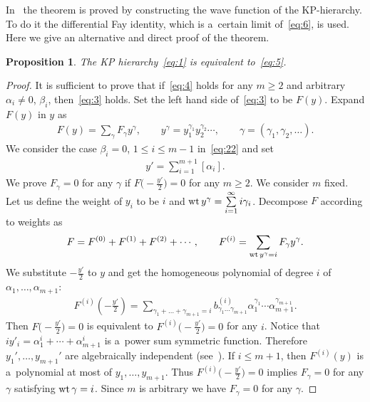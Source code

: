 \documentclass[11pt]{article}
\newtheorem{proposition}{Proposition}
\begin{document}
In~\cite{TT1} the theorem is proved by constructing the wave function of the KP-hierarchy.
To do it the dif\/ferential Fay identity, which is a~certain limit of~\eqref{eq:6}, is used.
Here we give an alternative and direct proof of the theorem.
\begin{proposition}\label{proposition1}
The KP hierarchy~\eqref{eq:1} is equivalent to~\eqref{eq:5}.
\end{proposition}
\begin{proof}
It is suf\/f\/icient to prove that if~\eqref{eq:4} holds for any $m\ge2$ and arbitrary
$\alpha_i\neq0$, $\beta_i$, then~\eqref{eq:3} holds.
Set the left hand side of~\eqref{eq:3} to be $F(y)$.
Expand $F(y)$ in $y$ as
\begin{gather*}%
F(y)=\sum_\gamma F_\gamma y^\gamma,\qquad  y^\gamma=y_1^{\gamma_1}y_2^{\gamma_2}
\cdots,\qquad \gamma=(\gamma_1,\gamma_2,\dots).
\end{gather*}
We consider the case $\beta_i=0$, $1\le i\le m-1$ in~\eqref{eq:22} and set
\begin{gather*}%
y'=\sum_{i=1}^{m+1}[\alpha_i].
\end{gather*}
We prove $F_\gamma=0$ for any $\gamma$ if $F\big({-}\frac{y'}{2}\big)=0$ for any $m\ge2$.
We consider $m$ f\/ixed.
Let us def\/ine the weight of $y_i$ to be $i$ and ${\rm wt}\,y^\gamma=\sum\limits_{i=1}^{\infty}i\gamma_i$.
Decompose $F$ according to weights as
\begin{gather*}
F=F^{(0)}+F^{(1)}+F^{(2)}+\cdots,
\qquad
F^{(i)}=\sum_{{\rm wt}\,y^\gamma=i}F_\gamma y^\gamma.
\end{gather*}
We substitute $-\frac{y'}{2}$ to $y$ and get the homogeneous polynomial of degree $i$ of
$\alpha_1,\dots,\alpha_{m+1}$:
\begin{gather*}%
F^{(i)}\left(-\frac{y'}{2}\right)=\sum_{\gamma_1+\dots+\gamma_{m+1}=i}b^{(i)}_{\gamma_1\dots\gamma_{m+1}}
\alpha_1^{\gamma_1}\cdots\alpha_{m+1}^{\gamma_{m+1}}.
\end{gather*}
Then $F\big({-}\frac{y'}{2}\big)=0$ is equivalent to $F^{(i)}\big({-}\frac{y'}{2}\big)=0$ for any $i$.
Notice that $i y'_i=\alpha_1^i+\cdots+\alpha_{m+1}^i$ is a~power sum symmetric function.
Therefore $y_1',\dots,y_{m+1}'$ are algebraically independent (see~\cite[(2.12)]{Mac}).
If $i\le m+1$, then $F^{(i)}(y)$ is a~polynomial at most of $y_1,\dots,y_{m+1}$.
Thus $F^{(i)}\big({-}\frac{y'}{2}\big)=0$ implies $F_\gamma=0$ for any $\gamma$ satisfying ${\rm wt}\,\gamma=i$.
Since $m$ is arbitrary we have $F_\gamma=0$ for any $\gamma$.
\end{proof}
\setcounter{section}{3}
\setcounter{subsection}{0}
\setcounter{subsubsection}{0}
\setcounter{Theorem}{0}
\setcounter{equation}{27}
\setcounter{theorem}{2}
\setcounter{proposition}{6}
\setcounter{example}{2}
\end{document}
